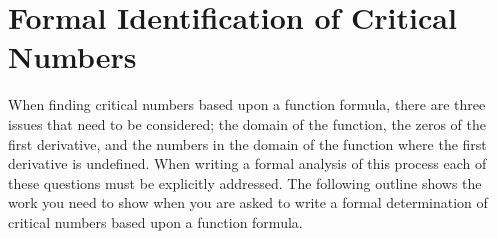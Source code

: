 \documentclass[12pt,]{book}
\theoremstyle{plain}
\theoremstyle{definition}
\numberwithin{equation}{section}
\begin{document}
\par\smallskip\noindent
\typeout{************************************************}
\typeout{************************************************}
\section[Formal ID of Critical Numbers]{Formal Identification of Critical Numbers}\label{section-formal-identification-of-critical-numbers}
When finding critical numbers based upon a function formula, there are three issues that need to be considered; the domain of the function, the zeros of the first derivative, and the numbers in the domain of the function where the first derivative is undefined.  When writing a formal analysis of this process each of these questions must be explicitly addressed.  The following outline shows the work you need to show when you are asked to write a formal determination of critical numbers based upon a function formula.%
\end{document}
